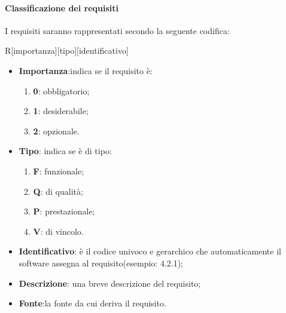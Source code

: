 		\paragraph{Classificazione  dei requisiti}
		I requisiti saranno rappresentati secondo la seguente codifica:
		\begin{center}
			R[importanza][tipo][identificativo]
		\end{center}
		\begin{itemize}
			\item \textbf{Importanza}:indica se il requisito è:
			\begin{enumerate}
				\item \textbf{0}: obbligatorio;
				\item \textbf{1}: desiderabile;
				\item \textbf{2}: opzionale.
			\end{enumerate}
			\item \textbf{Tipo}: indica se è di tipo:
			\begin{enumerate}
				\item \textbf{F}: funzionale;
				\item \textbf{Q}: di qualità;
				\item \textbf{P}: prestazionale;
				\item \textbf{V}: di vincolo.
			\end{enumerate}
			\item \textbf{Identificativo}: è il codice univoco e gerarchico che automaticamente il software assegna al requisito(esempio: 4.2.1);
			\item \textbf{Descrizione}: una breve descrizione del requisito;
			\item \textbf{Fonte}:la fonte da cui deriva il requisito.
		\end{itemize}
